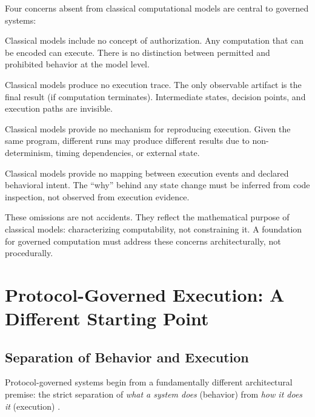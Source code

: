 \documentclass[11pt,a4paper]{article}
\begin{document}
Four concerns absent from classical computational models are central to governed systems:

\begin{description}[nosep]
    \item[Authority.] Classical models include no concept of authorization. Any computation that can be encoded can execute. There is no distinction between permitted and prohibited behavior at the model level.

    \item[Auditability.] Classical models produce no execution trace. The only observable artifact is the final result (if computation terminates). Intermediate states, decision points, and execution paths are invisible.

    \item[Deterministic Replay.] Classical models provide no mechanism for reproducing execution. Given the same program, different runs may produce different results due to non-determinism, timing dependencies, or external state.

    \item[Behavioral Traceability.] Classical models provide no mapping between execution events and declared behavioral intent. The ``why'' behind any state change must be inferred from code inspection, not observed from execution evidence.
\end{description}

These omissions are not accidents. They reflect the mathematical purpose of classical models: characterizing computability, not constraining it. A foundation for governed computation must address these concerns architecturally, not procedurally.



\section{Protocol-Governed Execution: A Different Starting Point}
\label{sec:protocol-governed}

\subsection{Separation of Behavior and Execution}

Protocol-governed systems begin from a fundamentally different architectural premise: the strict separation of \emph{what a system does} (behavior) from \emph{how it does it} (execution) \citep{ganti2024protocol}.
\end{document}
